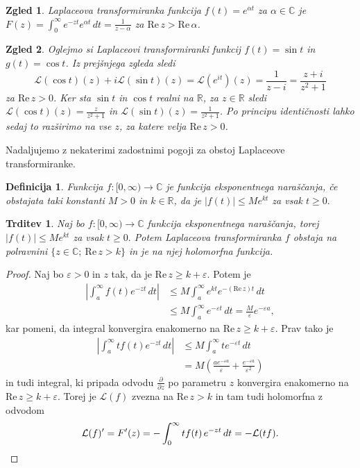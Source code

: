 \documentclass[10pt, a4paper]{article}
\newtheorem{trditev}[izr]{Trditev}
\newtheorem{defi}{Definicija}[section]
\newenvironment{noticeB}{%
  \tcolorbox[%
  notitle,
  empty,
  enhanced,  %
  breakable,
  coltext=black,
  colback=white, 
  fontupper=\rmfamily,
  parbox=false,
  noparskip,
  sharp corners,
  boxrule=-1pt,  %
  frame hidden,
  left=7pt,  %
  right=7pt,
  top=5pt,
  bottom=5pt,
  before skip=2.5ex plus 2pt,
  after skip=2.5ex plus 2pt,
  borderline west = {1.5pt}{-0.1pt}{blue!30!black}, %
  overlay unbroken and last={%
    \draw[color=black, line width=1.25pt]
    ($(frame.south west)+(1.pt, -0.1pt)$) -- ++(2em, 0);
  }
  ]}
{\endtcolorbox}
\newenvironment{definicija}{\begin{defi}\begin{noticeB}}{%
    \end{noticeB}\end{defi}}
\newtheorem{zgled}{Zgled}[section]
\newenvironment{noticeC}{%
  \tcolorbox[%
  notitle,
  empty,
  enhanced,  %
  breakable,
  coltext=black, 
  fontupper=\rmfamily,
  parbox=false,
  noparskip,
  sharp corners,
  boxrule=-1pt,  %
  frame hidden,
  left=7pt,  %
  right=7pt,
  top=5pt,
  bottom=5pt,
  before skip=2.5ex plus 2pt,
  after skip=2.5ex plus 2pt,
  overlay unbroken and last={%
  },
  ]}
{\endtcolorbox}
\newenvironment{dokaz}%
  {\begin{noticeC}\begin{proof}}%
  {\end{proof}\end{noticeC}}
\newcommand{\R}{\mathbb {R}}
\newcommand{\C}{\mathbb {C}}
\newcommand{\re}{\mathrm{Re}\,}
\begin{document}
\begin{zgled}
  Laplaceova transformiranka funkcija $f(t) = e^{\alpha t}$ za $\alpha \in \C$
  je $F(z) = \int_0 ^\infty e^{-zt} e^{\alpha t}\, dt = \frac{1}{z - \alpha}$
  za $\re z > \re \alpha$.
\end{zgled}

\begin{zgled}
  Oglejmo si Laplaceovi transformiranki funkcij $f(t) = \sin t$ in $g(t) = \cos t$.
  Iz prejšnjega zgleda sledi 
  $$\mathcal{L} (\cos t) (z) + i \mathcal{L} (\sin t) (z) = \mathcal{L} (e^{it}) (z) = \frac{1}{z - i} = \frac{z + i}{z^2 + 1}$$
  za $\re z > 0$. Ker sta $\sin t$ in $\cos t$ realni na $\R$, za $z \in \R$ sledi 
  $\mathcal{L} (\cos t) (z) = \frac{z}{z^2 + 1}$ in $\mathcal{L} (\sin t) (z) = \frac{1}{z^2 + 1}$.
  Po principu identičnosti lahko sedaj to razširimo na vse $z$, za katere velja $\re z > 0$.
\end{zgled}

Nadaljujemo z nekaterimi zadostnimi pogoji za obstoj Laplaceove transformiranke.

\begin{definicija}
  Funkcija $f: [0, \infty) \to \C$ je funkcija eksponentnega naraščanja, če obstajata 
  taki konstanti $M > 0$ in $k \in \R$, da je $|f(t)| \leq M e^{kt}$ za vsak $t \geq 0.$
\end{definicija}

\begin{trditev}
  Naj bo $f: [0, \infty) \to \C$ funkcija eksponentnega naraščanja, torej $|f(t)| \leq M e^{kt}$ za vsak $t \geq 0.$
  Potem Laplaceova transformiranka $f$ obstaja na polravnini $\{z \in \C;\ \re z > k\}$ in je na njej holomorfna funkcija.
\end{trditev}

\begin{dokaz}
  Naj bo $\varepsilon > 0$ in $z$ tak, da je $\re z \geq k + \varepsilon$.
  Potem je 
  \begin{align*}
    \left|\int_a ^\infty f(t) e^{-zt}\, dt \right| &\leq M \int_a ^\infty e^{kt} e^{-(\re z) t}\, dt\\
    &\leq M \int_a ^\infty e^{-\varepsilon t}\, dt = \frac{M}{\varepsilon} e^{-\varepsilon a},
  \end{align*}
  kar pomeni, da integral konvergira enakomerno na $\re z \geq k + \varepsilon$.
  Prav tako je 
  \begin{align*}
    \left| \int_a ^\infty t f(t) e^{-zt}\, dt \right| &\leq M \int_a ^\infty t e^{-\varepsilon t}\, dt\\
    &= M \left(\frac{a e^{-\varepsilon a}}{\varepsilon} + \frac{e^{-\varepsilon a}}{\varepsilon^2}\right)
  \end{align*}
  in tudi integral, ki pripada odvodu $\frac{\partial}{\partial z}$ po parametru $z$ 
  konvergira enakomerno na $\re z \geq k + \varepsilon.$
  Torej je $\mathcal{L} (f)$ zvezna na $\re z > k$ in tam tudi holomorfna z odvodom 
  \begin{equation*}
    \mathcal{L} (f)' = F'(z) = -\int_0 ^\infty t f(t)\, e^{-zt}\, dt = - \mathcal{L} (tf). \qedhere
  \end{equation*}
\end{dokaz}
\end{document}
